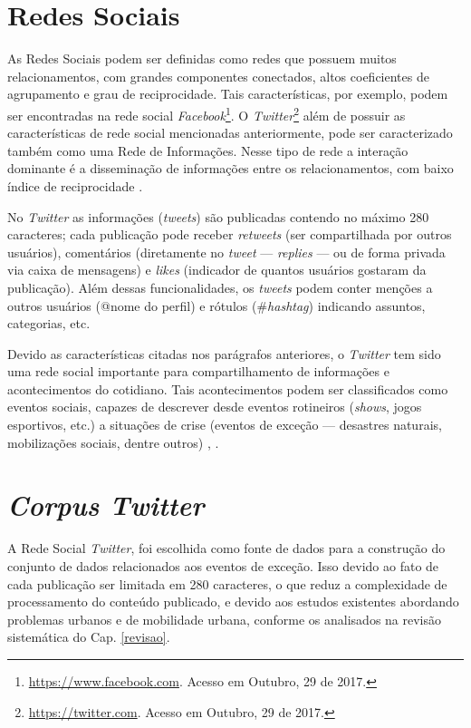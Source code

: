 \documentclass[
	12pt,				%
	oneside,			%
	a4paper,			%
	english,			%
	brazil				%
	]{abntex2ppgsi}
\begin{document}
{{\clearpage
 
 \section{Redes Sociais}
\label{sns}

As Redes Sociais podem ser definidas como redes que possuem muitos relacionamentos, com grandes componentes conectados, altos coeficientes de agrupamento e grau de reciprocidade. Tais características, por exemplo, podem ser encontradas na rede social \textit{Facebook}\footnote{\url{https://www.facebook.com}. Acesso em Outubro, 29 de 2017.}. O \textit{Twitter}\footnote{\url{https://twitter.com}. Acesso em Outubro, 29 de 2017.} além de possuir as características de rede social mencionadas anteriormente, pode ser caracterizado também como uma Rede de Informações. Nesse tipo de rede a interação dominante é a disseminação de informações entre os relacionamentos, com baixo índice de reciprocidade \cite{myers2014information}.

No \textit{Twitter} as informações (\textit{tweets}) são publicadas contendo no máximo 280 caracteres; cada publicação pode receber \textit{retweets} (ser compartilhada por outros usuários), comentários (diretamente no \textit{tweet} --- \textit{replies} ---  ou de forma privada via caixa de mensagens) e \textit{likes} (indicador de quantos usuários gostaram da publicação). Além dessas funcionalidades, os \textit{tweets} podem conter menções a outros usuários (@nome do perfil) e rótulos (\#\textit{hashtag}) indicando assuntos, categorias, etc.

Devido as características citadas nos parágrafos anteriores, o \textit{Twitter} tem sido uma rede social importante para compartilhamento de informações e acontecimentos do cotidiano. Tais acontecimentos podem ser classificados como eventos sociais, capazes de descrever desde eventos rotineiros (\textit{shows}, jogos esportivos, etc.) a situações de crise (eventos de exceção --- desastres naturais, mobilizações sociais, dentre outros) \cite{zhou2014event}, \cite{atefeh2015survey}.
 
\section{\textit{Corpus Twitter}}

A Rede Social \textit{Twitter}, foi escolhida como fonte de dados para a construção do conjunto de dados relacionados aos eventos de exceção. Isso devido ao fato de cada publicação ser limitada em 280 caracteres, o que reduz a complexidade de processamento do conteúdo publicado, e devido aos estudos existentes abordando problemas urbanos e de mobilidade urbana, conforme os analisados na revisão sistemática do Cap. \ref{revisao}.

}}
\end{document}
